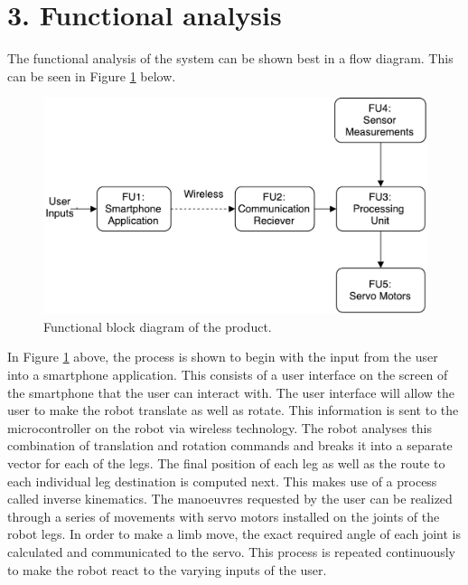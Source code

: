 
\section*{3. Functional analysis}

The functional analysis of the system can be shown best in a flow diagram. This can be seen in Figure \ref{fig:Func} below.

\begin{figure}[H]
\centering
\includegraphics[scale=0.8]{Proposal/FunctionalDiagram.pdf}
\caption{Functional block diagram of the product.}
\label{fig:Func}
\end{figure}

In Figure \ref{fig:Func} above, the process is shown to begin with the input from the user into a smartphone application. This consists of a user interface on the screen of the smartphone that the user can interact with. The user interface will allow the user to make the robot translate as well as rotate. This information is sent to the microcontroller on the robot via wireless technology.
The robot analyses this combination of translation and rotation commands and breaks it into a separate vector for each of the legs. The final position of each leg as well as the route to each individual leg destination is computed next. This makes use of a process called inverse kinematics. The manoeuvres requested by the user can be realized through a series of movements with servo motors installed on the joints of the robot legs. In order to make a limb move, the exact required angle of each joint is calculated and communicated to the servo. This process is repeated continuously to make the robot react to the varying inputs of the user.

\newpage


